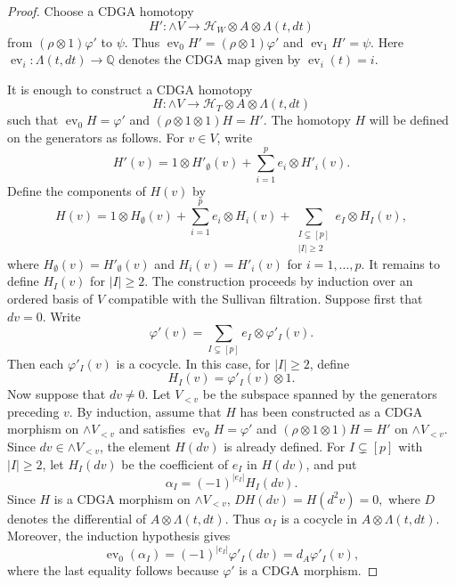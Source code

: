 \documentclass[10pt,a4paper]{amsart}
\newcommand{\ev}{\operatorname{ev}}
\begin{document}
\begin{proof}
Choose a CDGA homotopy
\[
H':
\wedge V
\longrightarrow
\mathcal H_W\otimes A\otimes \Lambda(t,dt)
\]
from $(\rho\otimes 1)\varphi'$ to $\psi$. Thus
$
\operatorname{ev}_0H'=(\rho\otimes 1)\varphi'
$
and
$
\ev_1H'=\psi.
$
Here $\ev_i:\Lambda(t,dt)\to \mathbb Q$ denotes the CDGA map given by $\operatorname{ev}_i (t) = i$.

It is enough to construct a CDGA homotopy
\[
H:
\wedge V
\longrightarrow
\mathcal H_T\otimes A\otimes \Lambda(t,dt)
\]
such that
$
\operatorname{ev}_0H=\varphi'
$
and
$
(\rho\otimes 1\otimes 1)H=H'.
$
The homotopy $H$ will be defined on the generators as follows.
For $v\in V$, write
\[
H'(v)
=
1\otimes H'_\emptyset(v)
+
\sum_{i=1}^p e_i\otimes H'_i(v).
\]
Define the components of $H(v)$ by
\[
H(v)
=
1\otimes H_\emptyset(v)
+
\sum_{i=1}^p e_i\otimes H_i(v)
+
\sum_{\substack{I\subsetneq[p]\\ |I|\geq 2}}
e_I\otimes H_I(v),
\]
where
$
H_\emptyset(v)=H'_\emptyset(v)
$
and
$
H_i(v)=H'_i(v)
$
for $i=1,\ldots,p$. It remains to define $H_I(v)$ for $|I|\geq 2$.
The construction proceeds by induction over an ordered basis of $V$ compatible
with the Sullivan filtration. Suppose first that $dv=0$.
Write
\[
        \varphi'(v)=\sum_{I\subsetneq[p]} e_I\otimes \varphi'_I(v).
\]
Then each $\varphi'_I(v)$ is a cocycle. In this case, for $|I|\geq 2$, define
\[
        H_I(v)=\varphi'_I(v)\otimes 1.
\]
Now suppose that $dv\neq 0$. Let $V_{<v}$ be the subspace spanned by the
generators preceding $v$.
By induction, assume that $H$ has been constructed
as a CDGA morphism on $\wedge V_{<v}$ and satisfies
$
\ev_0H=\varphi'
$
and
$
(\rho\otimes 1\otimes 1)H=H'
$
on $\wedge V_{<v}$. Since $dv\in\wedge V_{<v}$, the element $H(dv)$ is
already defined.
For $I\subsetneq[p]$ with $|I|\geq 2$, let $H_I(dv)$ be the
coefficient of $e_I$ in $H(dv)$, and put
\[
        \alpha_I=(-1)^{|e_I|}H_I(dv).
\]
Since $H$ is a CDGA morphism on $\wedge V_{<v}$,
$
        DH(dv)=H(d^2v)=0,
$
where $D$ denotes the differential of $A\otimes\Lambda(t,dt)$. 
Thus $\alpha_I$ is a cocycle in $A\otimes\Lambda(t,dt)$. 
Moreover, the induction hypothesis gives
\[
\operatorname{ev}_0(\alpha_I)
=
(-1)^{|e_I|}\varphi'_I(dv)
=
d_A\varphi'_I(v),
\]
where the last equality follows because $\varphi'$ is a CDGA morphism.


\end{proof}
\end{document}

